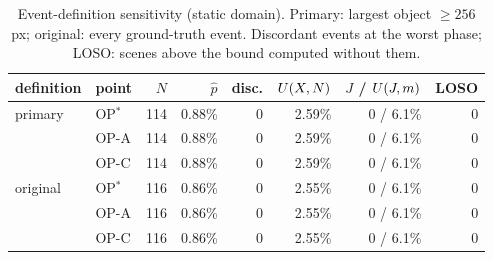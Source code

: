 \begin{table}[t]
\centering
\caption{Event-definition sensitivity (static domain). Primary: largest object $\ge 256$ px; original: every ground-truth event. Discordant events at the worst phase; LOSO: scenes above the bound computed without them.}
\label{tab:eventdef}
\scriptsize
\setlength{\tabcolsep}{3pt}
\begin{tabular}{@{}llrrrrrr@{}}
\toprule
definition & point & $N$ & $\hat p$ & disc. & $U(X,N)$ & $J$ / $U(J,m)$ & LOSO \\
\midrule
primary & OP$^\ast$ & 114 & 0.88\% & 0 & 2.59\% & 0 / 6.1\% & 0 \\
 & OP-A & 114 & 0.88\% & 0 & 2.59\% & 0 / 6.1\% & 0 \\
 & OP-C & 114 & 0.88\% & 0 & 2.59\% & 0 / 6.1\% & 0 \\
\midrule
original & OP$^\ast$ & 116 & 0.86\% & 0 & 2.55\% & 0 / 6.1\% & 0 \\
 & OP-A & 116 & 0.86\% & 0 & 2.55\% & 0 / 6.1\% & 0 \\
 & OP-C & 116 & 0.86\% & 0 & 2.55\% & 0 / 6.1\% & 0 \\
\bottomrule
\end{tabular}
\end{table}
